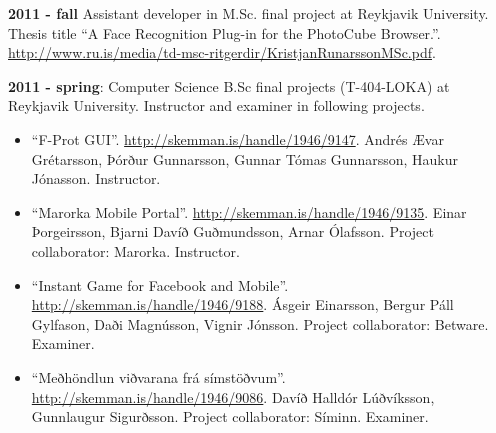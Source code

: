 \textbf{2011 - fall}
Assistant developer in M.Sc. final project at Reykjavik University. Thesis
title ``A Face Recognition Plug-in for the PhotoCube Browser.''.
\url{http://www.ru.is/media/td-msc-ritgerdir/KristjanRunarssonMSc.pdf}.


\textbf{2011 - spring}:
Computer Science B.Sc final projects (T-404-LOKA) at Reykjavik University.
Instructor and examiner in following projects.

\begin{itemize}
\item ``F-Prot GUI''. \url{http://skemman.is/handle/1946/9147}. Andrés Ævar
    Grétarsson, Þórður Gunnarsson, Gunnar Tómas Gunnarsson, Haukur Jónasson.
        Instructor.

\item ``Marorka Mobile Portal''. \url{http://skemman.is/handle/1946/9135}.
    Einar Þorgeirsson, Bjarni Davíð Guðmundsson, Arnar Ólafsson. Project
        collaborator: Marorka. Instructor.

\item ``Instant Game for Facebook and Mobile''.
    \url{http://skemman.is/handle/1946/9188}. Ásgeir Einarsson, Bergur Páll
        Gylfason, Daði Magnússon, Vignir Jónsson. Project collaborator:
        Betware. Examiner.

\item ``Meðhöndlun viðvarana frá símstöðvum''.
    \url{http://skemman.is/handle/1946/9086}. Davíð Halldór Lúðvíksson,
        Gunnlaugur Sigurðsson. Project collaborator: Síminn. Examiner.
\end{itemize}
